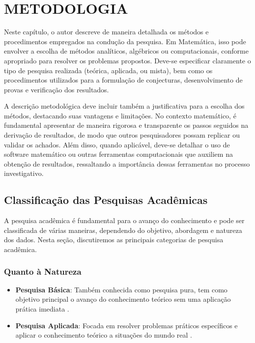 
\chapter{METODOLOGIA}

Neste capítulo, o autor descreve de maneira detalhada os métodos e procedimentos empregados na condução da pesquisa. Em Matemática, isso pode envolver a escolha de métodos analíticos, algébricos ou computacionais, conforme apropriado para resolver os problemas propostos. Deve-se especificar claramente o tipo de pesquisa realizada (teórica, aplicada, ou mista), bem como os procedimentos utilizados para a formulação de conjecturas, desenvolvimento de provas e verificação dos resultados.

A descrição metodológica deve incluir também a justificativa para a escolha dos métodos, destacando suas vantagens e limitações. No contexto matemático, é fundamental apresentar de maneira rigorosa e transparente os passos seguidos na derivação de resultados, de modo que outros pesquisadores possam replicar ou validar os achados. Além disso, quando aplicável, deve-se detalhar o uso de software matemático ou outras ferramentas computacionais que auxiliem na obtenção de resultados, ressaltando a importância dessas ferramentas no processo investigativo.

\section{Classificação das Pesquisas Acadêmicas}
A pesquisa acadêmica é fundamental para o avanço do conhecimento e pode ser classificada de várias maneiras, dependendo do objetivo, abordagem e natureza dos dados. Nesta seção, discutiremos as principais categorias de pesquisa acadêmica.

\subsection{Quanto à Natureza}
\begin{itemize}
    \item \textbf{Pesquisa Básica}: Também conhecida como pesquisa pura, tem como objetivo principal o avanço do conhecimento teórico sem uma aplicação prática imediata \cite{marconi2010metodologia}.
    \item \textbf{Pesquisa Aplicada}: Focada em resolver problemas práticos específicos e aplicar o conhecimento teórico a situações do mundo real \cite{gil2008metodos}.
\end{itemize}

